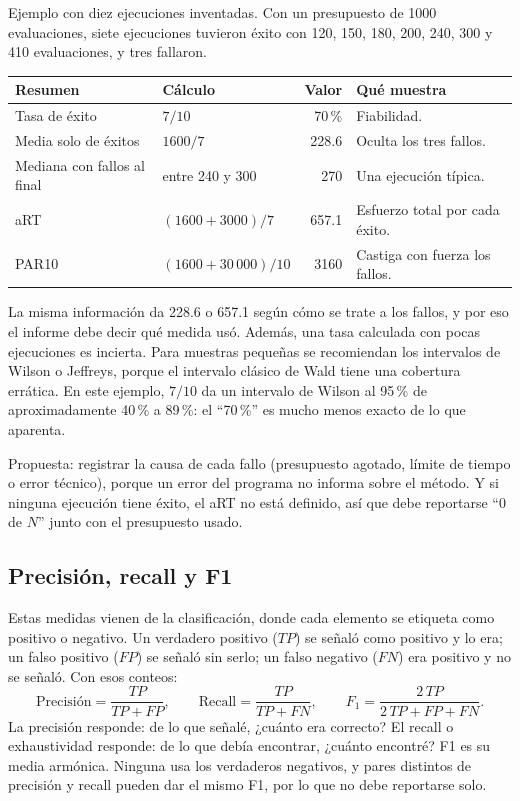 Ejemplo con diez ejecuciones inventadas. Con un presupuesto de 1000 evaluaciones, siete ejecuciones tuvieron éxito con 120, 150, 180, 200, 240, 300 y 410 evaluaciones, y tres fallaron.

\begin{center}

\begin{adjustbox}{max width=\linewidth}
\begin{tabular}{@{}P{4.8cm}P{3.5cm}rP{5.3cm}@{}}
\toprule
Resumen & Cálculo & Valor & Qué muestra\\
\midrule
Tasa de éxito & $7/10$ & 70\,\% & Fiabilidad.\\
Media solo de éxitos & $1600/7$ & 228.6 & Oculta los tres fallos.\\
Mediana con fallos al final & entre 240 y 300 & 270 & Una ejecución típica.\\
aRT & $(1600+3000)/7$ & 657.1 & Esfuerzo total por cada éxito.\\
PAR10 & $(1600+30\,000)/10$ & 3160 & Castiga con fuerza los fallos.\\
\bottomrule
\end{tabular}
\end{adjustbox}
\end{center}

La misma información da 228.6 o 657.1 según cómo se trate a los fallos, y por eso el informe debe decir qué medida usó. Además, una tasa calculada con pocas ejecuciones es incierta. Para muestras pequeñas se recomiendan los intervalos de Wilson o Jeffreys, porque el intervalo clásico de Wald tiene una cobertura errática.\cite{de8} En este ejemplo, $7/10$ da un intervalo de Wilson al 95\,\% de aproximadamente 40\,\% a 89\,\%: el ``70\,\%'' es mucho menos exacto de lo que aparenta.

Propuesta: registrar la causa de cada fallo (presupuesto agotado, límite de tiempo o error técnico), porque un error del programa no informa sobre el método. Y si ninguna ejecución tiene éxito, el aRT no está definido, así que debe reportarse ``0 de $N$'' junto con el presupuesto usado.

\subsection{Precisión, recall y F1}
Estas medidas vienen de la clasificación, donde cada elemento se etiqueta como positivo o negativo. Un verdadero positivo ($TP$) se señaló como positivo y lo era; un falso positivo ($FP$) se señaló sin serlo; un falso negativo ($FN$) era positivo y no se señaló. Con esos conteos:\cite{de9}
\begin{equation}
\text{Precisión}=\frac{TP}{TP+FP},\qquad
\text{Recall}=\frac{TP}{TP+FN},\qquad
F_1=\frac{2\,TP}{2\,TP+FP+FN}.\label{de:eq:prf}
\end{equation}
La precisión responde: de lo que señalé, ¿cuánto era correcto? El recall o exhaustividad responde: de lo que debía encontrar, ¿cuánto encontré? F1 es su media armónica. Ninguna usa los verdaderos negativos, y pares distintos de precisión y recall pueden dar el mismo F1, por lo que no debe reportarse solo.\cite{de9}

